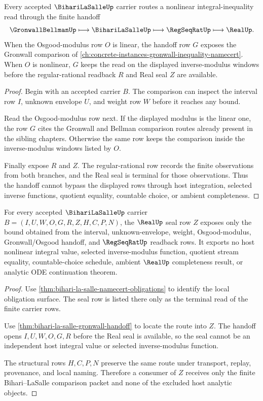 \begin{theorem}
\label{thm:bihari-la-salle-gronwall-handoff}
Every accepted $\BihariLaSalleUp$ carrier routes a nonlinear integral-inequality read through the finite handoff
$$
\GronwallBellmanUp \longmapsto \BihariLaSalleUp \longmapsto \RegSeqRatUp \longmapsto \RealUp.
$$
When the Osgood-modulus row $O$ is linear, the handoff row $G$ exposes the Gronwall comparison of \autoref{ch:concrete-instances-gronwall-inequality-namecert}. When $O$ is nonlinear, $G$ keeps the read on the displayed inverse-modulus windows before the regular-rational readback $R$ and Real seal $Z$ are available.
\end{theorem}
\begin{proof}
Begin with an accepted carrier $B$. The comparison can inspect the interval row $I$, unknown envelope $U$, and weight row $W$ before it reaches any bound.

Read the Osgood-modulus row next. If the displayed modulus is the linear one, the row $G$ cites the Gronwall and Bellman comparison routes already present in the sibling chapters. Otherwise the same row keeps the comparison inside the inverse-modulus windows listed by $O$.

Finally expose $R$ and $Z$. The regular-rational row records the finite observations from both branches, and the Real seal is terminal for those observations. Thus the handoff cannot bypass the displayed rows through host integration, selected inverse functions, quotient equality, countable choice, or ambient completeness.
\end{proof}

\begin{theorem}
\label{thm:bihari-la-salle-real-seal-nonescape}
For every accepted $\BihariLaSalleUp$ carrier $B=(I,U,W,O,G,R,Z,H,C,P,N)$, the $\RealUp$ seal row $Z$ exposes only the bound obtained from the interval, unknown-envelope, weight, Osgood-modulus, Gronwall/Osgood handoff, and $\RegSeqRatUp$ readback rows. It exports no host nonlinear integral value, selected inverse-modulus function, quotient stream equality, countable-choice schedule, ambient $\RealUp$ completeness result, or analytic ODE continuation theorem.
\end{theorem}
\begin{proof}
Use \autoref{thm:bihari-la-salle-namecert-obligations} to identify the local obligation surface. The seal row is listed there only as the terminal read of the finite carrier rows.

Use \autoref{thm:bihari-la-salle-gronwall-handoff} to locate the route into $Z$. The handoff opens $I,U,W,O,G,R$ before the Real seal is available, so the seal cannot be an independent host integral value or selected inverse-modulus function.

The structural rows $H,C,P,N$ preserve the same route under transport, replay, provenance, and local naming. Therefore a consumer of $Z$ receives only the finite Bihari--LaSalle comparison packet and none of the excluded host analytic objects.
\end{proof}

